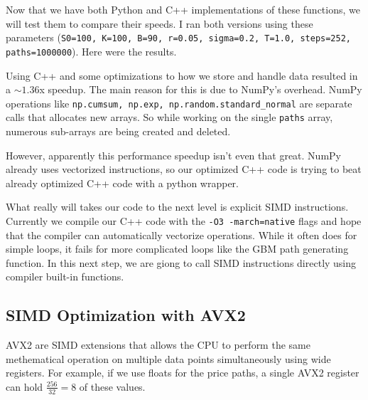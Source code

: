 \documentclass{article}
\begin{document}
Now that we have both Python and C++ implementations of these functions, we will test them to compare their speeds.
I ran both versions using these parameters (\texttt{S0=100, K=100, B=90, r=0.05, sigma=0.2, T=1.0, steps=252, paths=1000000}).
Here were the results.
\begin{figure}[h]
\centering
{}
\end{figure}

Using C++ and some optimizations to how we store and handle data resulted in a \(\sim1.36\)x speedup.
The main reason for this is due to NumPy's overhead.
NumPy operations like \texttt{np.cumsum, np.exp, np.random.standard\_normal} are separate calls that allocates new arrays.
So while working on the single \texttt{paths} array, numerous sub-arrays are being created and deleted.

However, apparently this performance speedup isn't even that great.
NumPy already uses vectorized instructions, so our optimized C++ code is trying to beat already optimized C++ code with a python wrapper.

What really will takes our code to the next level is explicit SIMD instructions.
Currently we compile our C++ code with the \texttt{-O3 -march=native} flags and hope that the compiler can automatically vectorize operations.
While it often does for simple loops, it fails for more complicated loops like the GBM path generating function.
In this next step, we are giong to call SIMD instructions directly using compiler built-in functions.

\subsection*{SIMD Optimization with AVX2}
AVX2 are SIMD extensions that allows the CPU to perform the same methematical operation on multiple data points simultaneously using wide registers.
For example, if we use floats for the price paths, a single AVX2 register can hold \(\frac{256}{32}=8\) of these values.
\end{document}
